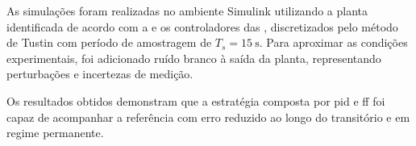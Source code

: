As simulações foram realizadas no ambiente Simulink utilizando a planta
identificada de acordo com a  e os controladores das
, discretizados pelo método de
Tustin com período de amostragem de $T_s=\SI{15}{\second}$. Para aproximar as
condições experimentais, foi adicionado ruído branco à saída da planta,
representando perturbações e incertezas de medição.

Os resultados obtidos demonstram que a estratégia composta por \gls{pid} e
\gls{ff} foi capaz de acompanhar a referência com erro reduzido ao longo do
transitório e em regime permanente.